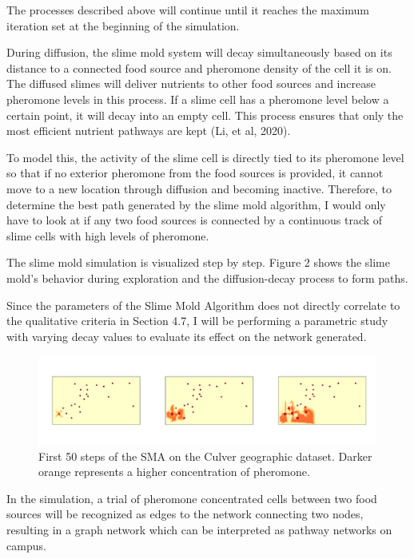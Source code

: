 \documentclass[11pt]{article}
\begin{document}
The processes described above will continue until it reaches the maximum iteration set at the beginning of the simulation. \par
During diffusion, the slime mold system will decay simultaneously based on its distance to a connected food source and pheromone density of the cell it is on. The diffused slimes will deliver nutrients to other food sources and increase pheromone levels in this process. If a slime cell has a pheromone level below a certain point, it will decay into an empty cell. This process ensures that only the most efficient nutrient pathways are kept (Li, et al, 2020). \par
To model this, the activity of the slime cell is directly tied to its pheromone level so that if no exterior pheromone from the food sources is provided, it cannot move to a new location through diffusion and becoming inactive. Therefore, to determine the best path generated by the slime mold algorithm, I would only have to look at if any two food sources is connected by a continuous track of slime cells with high levels of pheromone. \par
The slime mold simulation is visualized step by step. Figure 2 shows the slime mold’s behavior during exploration and the diffusion-decay process to form paths. \par
Since the parameters of the Slime Mold Algorithm does not directly correlate to the qualitative criteria in Section 4.7, I will be performing a parametric study with varying decay values to evaluate its effect on the network generated. 
\begin{figure}[H]
\centering
\hspace*{-1cm}
\includegraphics{exampleSMA.png}
\caption{First 50 steps of the SMA on the Culver geographic dataset. Darker orange represents a higher concentration of pheromone.}
\end{figure}
In the simulation, a trial of pheromone concentrated cells between two food sources will be recognized as edges to the network connecting two nodes, resulting in a graph network which can be interpreted as pathway networks on campus.
\par
\end{document}
